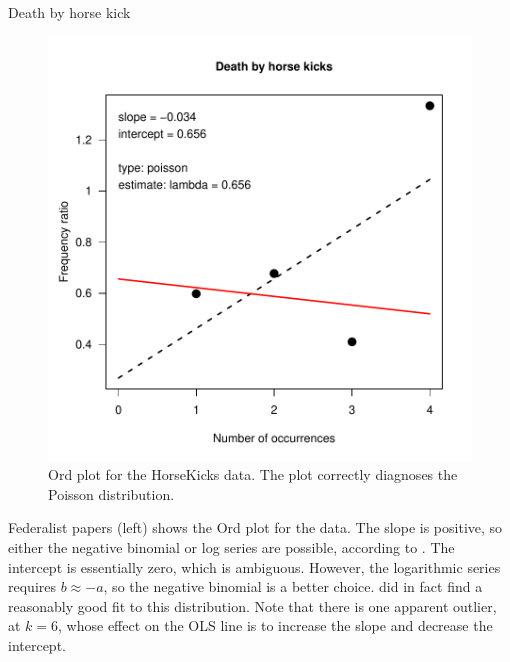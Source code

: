 \documentclass[11pt]{book}
\renewenvironment{knitrout}{\small\renewcommand{\baselinestretch}{.85}}{} %
\begin{document}
\begin{Example}[horskick3]{Death by horse kick}
\begin{knitrout}
\color{fgcolor}\begin{kframe}
\begin{alltt}
          \hlstd{=} \hlstd{,} \hlstd{=}\hlstd{(}\hlstd{=}\hlstd{),} \hlstd{=}\hlstd{)}
\end{alltt}
\end{kframe}\begin{figure}[!htbp]


\centerline{\includegraphics[width=.5\textwidth]{ch03/fig/ordplot2} }

\caption[Ord plot for the HorseKicks data]{Ord plot for the HorseKicks data. The plot correctly diagnoses the Poisson distribution.\label{fig:ordplot2}}
\end{figure}


\end{knitrout}
\end{Example}

\begin{Example}[madison3]{Federalist papers}
 (left) shows the Ord plot for the  data.
The slope is positive, so either the
negative binomial or log series are possible, according to .
The intercept is
essentially zero, which is ambiguous.  However, the logarithmic
series requires \(b \approx  - a\), so the negative binomial is a
better choice.  \citet{MostellerWallace:63,MostellerWallace:84} did in fact find a reasonably
good fit to this distribution. Note that there is one apparent outlier,
at $k=6$, whose effect on the OLS line is to increase the slope and decrease
the intercept.
\end{Example}
\end{document}
